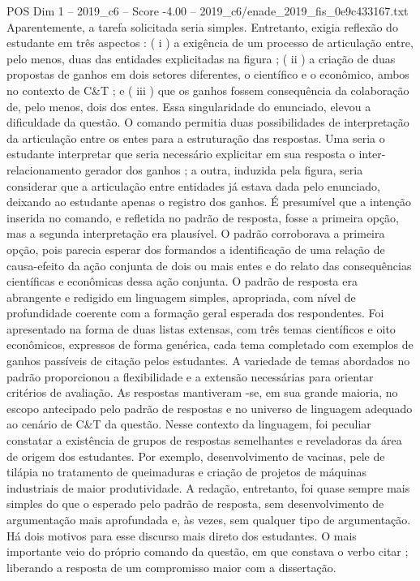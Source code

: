 \begin{textsample}{POS Dim 1 – 2019\_c6 – Score -4.00 – 2019\_c6/enade\_2019\_fis\_0e9c433167.txt}
Aparentemente, a tarefa solicitada seria simples.
Entretanto, exigia reflexão do estudante em três aspectos : ( i ) a exigência de um processo de articulação entre, pelo menos, duas das entidades explicitadas na figura ; ( ii ) a criação de duas propostas de ganhos em dois setores diferentes, o científico e o econômico, ambos no contexto de C\&T ; e ( iii ) que os ganhos fossem consequência da colaboração de, pelo menos, dois dos entes.
Essa singularidade do enunciado, elevou a dificuldade da questão.
O comando permitia duas possibilidades de interpretação da articulação entre os entes para a estruturação das respostas.
Uma seria o estudante interpretar que seria necessário explicitar em sua resposta o inter-relacionamento gerador dos ganhos ; a outra, induzida pela figura, seria considerar que a articulação entre entidades já estava dada pelo enunciado, deixando ao estudante apenas o registro dos ganhos.
É presumível que a intenção inserida no comando, e refletida no padrão de resposta, fosse a primeira opção, mas a segunda interpretação era plausível.
O padrão corroborava a primeira opção, pois parecia esperar dos formandos a identificação de uma relação de causa-efeito da ação conjunta de dois ou mais entes e do relato das consequências científicas e econômicas dessa ação conjunta.
O padrão de resposta era abrangente e redigido em linguagem simples, apropriada, com nível de profundidade coerente com a formação geral esperada dos respondentes.
Foi apresentado na forma de duas listas extensas, com três temas científicos e oito econômicos, expressos de forma genérica, cada tema completado com exemplos de ganhos passíveis de citação pelos estudantes.
A variedade de temas abordados no padrão proporcionou a flexibilidade e a extensão necessárias para orientar critérios de avaliação.
As respostas mantiveram -se, em sua grande maioria, no escopo antecipado pelo padrão de respostas e no universo de linguagem adequado ao cenário de C\&T da questão.
Nesse contexto da linguagem, foi peculiar constatar a existência de grupos de respostas semelhantes e reveladoras da área de origem dos estudantes.
Por exemplo, desenvolvimento de vacinas, pele de tilápia no tratamento de queimaduras e criação de projetos de máquinas industriais de maior produtividade.
A redação, entretanto, foi quase sempre mais simples do que o esperado pelo padrão de resposta, sem desenvolvimento de argumentação mais aprofundada e, às vezes, sem qualquer tipo de argumentação.
Há dois motivos para esse discurso mais direto dos estudantes.
O mais importante veio do próprio comando da questão, em que constava o verbo citar ; liberando a resposta de um compromisso maior com a dissertação.

\end{textsample}
